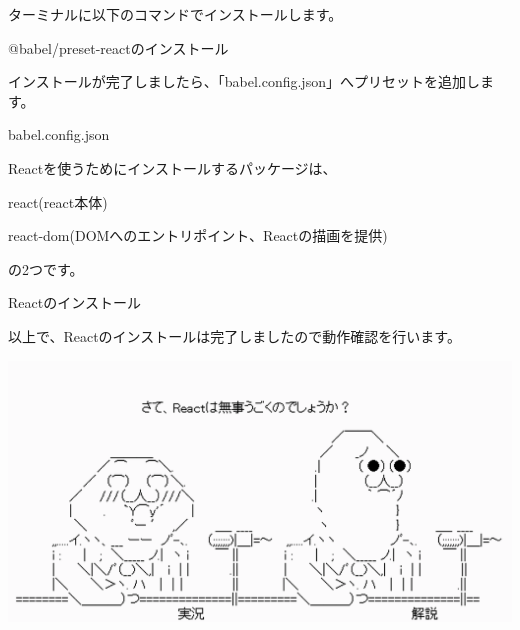 \clearpage


ターミナルに以下のコマンドでインストールします。

\def\startercodeblockfontsize{}
\begin{starterterminal}[]{@babel/preset{-}reactのインストール}\end{starterterminal}

インストールが完了しましたら、「babel.config.json」へプリセットを追加します。

\def\startercodeblockfontsize{}
\begin{starterprogram}[]{babel.config.json}\end{starterprogram}
\vspace*{\baselineskip}

Reactを使うためにインストールするパッケージは、

\begin{starteritemize}
\item react(react本体)
\item react{-}dom(DOMへのエントリポイント、Reactの描画を提供)
\end{starteritemize}

の2つです。

\def\startercodeblockfontsize{}
\begin{starterterminal}[]{Reactのインストール}\end{starterterminal}

以上で、Reactのインストールは完了しましたので動作確認を行います。

\begin{reviewimage}[H]%
\includegraphics[width=0.7\maxwidth]{./images/02-create-react-app/pray3.png}%
\label{image:02-create-react-app:pray3}
\end{reviewimage}

